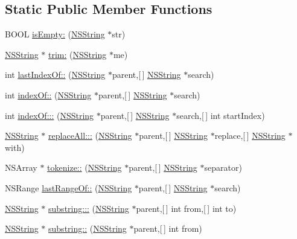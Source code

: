 \subsection*{\-Static \-Public \-Member \-Functions}
\begin{DoxyCompactItemize}
\item 
\-B\-O\-O\-L \hyperlink{interface_string_util_a40083507052fd562a1a256bbd3744d1f}{is\-Empty\-:} (\hyperlink{class_n_s_string}{\-N\-S\-String} $\ast$str)
\item 
\hyperlink{class_n_s_string}{\-N\-S\-String} $\ast$ \hyperlink{interface_string_util_add1b89265fef6ea0863897267096657c}{trim\-:} (\hyperlink{class_n_s_string}{\-N\-S\-String} $\ast$me)
\item 
int \hyperlink{interface_string_util_a49957101b9646c548bae488c065d91af}{last\-Index\-Of\-::} (\hyperlink{class_n_s_string}{\-N\-S\-String} $\ast$parent,\mbox{[}$\,$\mbox{]} \hyperlink{class_n_s_string}{\-N\-S\-String} $\ast$search)
\item 
int \hyperlink{interface_string_util_a77634d6fd6126b5f3b2cb85412f3f004}{index\-Of\-::} (\hyperlink{class_n_s_string}{\-N\-S\-String} $\ast$parent,\mbox{[}$\,$\mbox{]} \hyperlink{class_n_s_string}{\-N\-S\-String} $\ast$search)
\item 
int \hyperlink{interface_string_util_a27c8ab20cf07adc4d69e7c6e16ba7c85}{index\-Of\-:::} (\hyperlink{class_n_s_string}{\-N\-S\-String} $\ast$parent,\mbox{[}$\,$\mbox{]} \hyperlink{class_n_s_string}{\-N\-S\-String} $\ast$search,\mbox{[}$\,$\mbox{]} int start\-Index)
\item 
\hyperlink{class_n_s_string}{\-N\-S\-String} $\ast$ \hyperlink{interface_string_util_ad64882b6b8f2cab34d303cf781fca08b}{replace\-All\-:::} (\hyperlink{class_n_s_string}{\-N\-S\-String} $\ast$parent,\mbox{[}$\,$\mbox{]} \hyperlink{class_n_s_string}{\-N\-S\-String} $\ast$replace,\mbox{[}$\,$\mbox{]} \hyperlink{class_n_s_string}{\-N\-S\-String} $\ast$with)
\item 
\-N\-S\-Array $\ast$ \hyperlink{interface_string_util_a71301e03736decc69065fc6e3dbf71d4}{tokenize\-::} (\hyperlink{class_n_s_string}{\-N\-S\-String} $\ast$parent,\mbox{[}$\,$\mbox{]} \hyperlink{class_n_s_string}{\-N\-S\-String} $\ast$separator)
\item 
\-N\-S\-Range \hyperlink{interface_string_util_a84a04a7b62773715e56d33d94df8b360}{last\-Range\-Of\-::} (\hyperlink{class_n_s_string}{\-N\-S\-String} $\ast$parent,\mbox{[}$\,$\mbox{]} \hyperlink{class_n_s_string}{\-N\-S\-String} $\ast$search)
\item 
\hyperlink{class_n_s_string}{\-N\-S\-String} $\ast$ \hyperlink{interface_string_util_a0b8779d7bf0ce60fab42056925e09177}{substring\-:::} (\hyperlink{class_n_s_string}{\-N\-S\-String} $\ast$parent,\mbox{[}$\,$\mbox{]} int from,\mbox{[}$\,$\mbox{]} int to)
\item 
\hyperlink{class_n_s_string}{\-N\-S\-String} $\ast$ \hyperlink{interface_string_util_a0c689e7fdd9f1d79e2b69af0f40e1a4f}{substring\-::} (\hyperlink{class_n_s_string}{\-N\-S\-String} $\ast$parent,\mbox{[}$\,$\mbox{]} int from)
\end{DoxyCompactItemize}


